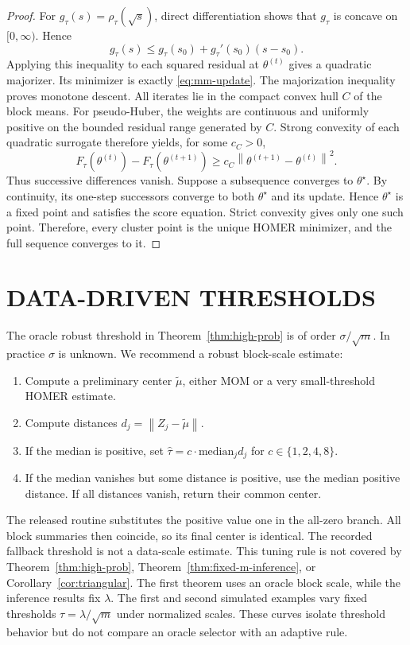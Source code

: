 \documentclass[twoside]{article}
\theoremstyle{definition}
\newcommand{\norm}[1]{\left\lVert #1\right\rVert}
\begin{document}
\begin{proof}
For $g_\tau(s)=\rho_\tau(\sqrt s)$, direct differentiation shows that $g_\tau$ is concave on $[0,\infty)$. Hence
\[
    g_\tau(s)\le g_\tau(s_0)+g_\tau'(s_0)(s-s_0).
\]
Applying this inequality to each squared residual at $\theta^{(t)}$ gives a quadratic majorizer. Its minimizer is exactly \eqref{eq:mm-update}. The majorization inequality proves monotone descent. All iterates lie in the compact convex hull $C$ of the block means. For pseudo-Huber, the weights are continuous and uniformly positive on the bounded residual range generated by $C$. Strong convexity of each quadratic surrogate therefore yields, for some $c_C>0$,
\[
    F_\tau(\theta^{(t)})-F_\tau(\theta^{(t+1)})
    \ge c_C\norm{\theta^{(t+1)}-\theta^{(t)}}^2.
\]
Thus successive differences vanish. Suppose a subsequence converges to $\theta^\star$. By continuity, its one-step successors converge to both $\theta^\star$ and its update. Hence $\theta^\star$ is a fixed point and satisfies the score equation. Strict convexity gives only one such point. Therefore, every cluster point is the unique HOMER minimizer, and the full sequence converges to it.
\end{proof}

\section{DATA-DRIVEN THRESHOLDS}\label{app:tuning}

The oracle robust threshold in Theorem~\ref{thm:high-prob} is of order $\sigma/\sqrt m$. In practice $\sigma$ is unknown. We recommend a robust block-scale estimate:
\begin{enumerate}[leftmargin=*]
    \item Compute a preliminary center $\tilde\mu$, either MOM or a very small-threshold HOMER estimate.
    \item Compute distances $d_j=\norm{Z_j-\tilde\mu}$.
    \item If the median is positive, set $\hat\tau=c\cdot \mathrm{median}_j d_j$ for $c\in\{1,2,4,8\}$.
    \item If the median vanishes but some distance is positive, use the median positive distance. If all distances vanish, return their common center.
\end{enumerate}
The released routine substitutes the positive value one in the all-zero branch. All block summaries then coincide, so its final center is identical. The recorded fallback threshold is not a data-scale estimate.
This tuning rule is not covered by Theorem~\ref{thm:high-prob}, Theorem~\ref{thm:fixed-m-inference}, or Corollary~\ref{cor:triangular}. The first theorem uses an oracle block scale, while the inference results fix $\lambda$. The first and second simulated examples vary fixed thresholds $\tau=\lambda/\sqrt m$ under normalized scales. These curves isolate threshold behavior but do not compare an oracle selector with an adaptive rule.
\end{document}
